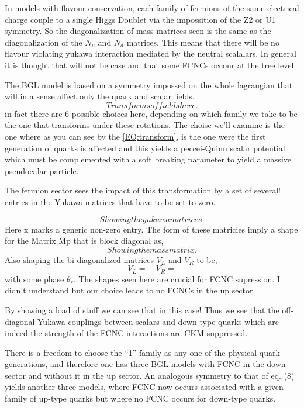 In models with flavour conservation, each family  of fermions of the same electrical charge couple to a single Higgs Doublet via the impossition of the Z2 or U1 symmetry. So the diagonalization of mass matrices seen is the same as the diagonalization of the $N_u$ and $N_d$ matrices. This means that there will be no flavour violating yukawa interaction mediated by the neutral scalalars. In general it is thought that will not be case and that some FCNCs occour at the tree level. 

The BGL model is based on a symmetry impossed on the whole lagrangian that will in a sense affect only the quark and scalar fields. 
\begin{equation}
\label{EQ:transform}
Transforms of fields here. 
\end{equation}
in fact there are 6 possible choices here, depending on which family we take to be the one that transforms under these rotations.  The choise we'll examine is the one where as you can see by the \ref{EQ:transform}, is the one were the first generation of quarks is affected and this yields a peccei-Quinn scalar potential which must be complemented with a soft breaking parameter to yield a massive pseudocalar particle. 

The fermion sector sees the impact of this transformation by a set of several! entries in the Yukawa matrices that have to be set to zero. 

\begin{equation}
Showing the yukawa matrices.
\end{equation} 
Here x marks a generic non-zero entry. The form of these matricies imply a shape for the Matrix Mp that is block diagonal as,
\begin{equation}
Showing the mass matrix. 
\end{equation}
Also shaping the bi-diagonalized matrices $V_L$ and $V_R$ to be,
\begin{equation}
V_L = \quad V_R = 
\end{equation}
with some phase $\theta_r$. The shapes seen here are crucial for FCNC supression. I didn't understand but our choice leads to no FCNCs in the up sector.  


By showing a load of stuff we can see that in this case! Thus we see that the off-diagonal Yukawa couplings between scalars and down-type quarks which are indeed the strength of the FCNC interactions are CKM-suppressed. 

There is a freedom to choose the “1” family as
any one of the physical quark generations, and therefore one has three BGL models with FCNC in the down
sector and without it in the up sector. An analogous symmetry to that of eq. (8) yields another three models,
where FCNC now occurs associated with a given family of up-type quarks but where no FCNC occurs for
down-type quarks.

